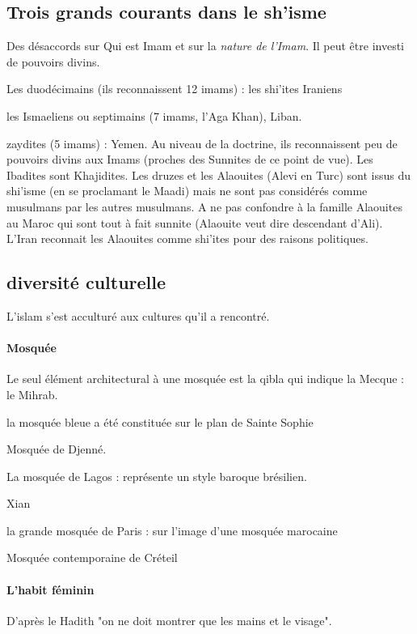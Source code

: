 \subsection{Trois grands courants dans le sh'isme}


\begin{Synthesis}
Des désaccords sur Qui est Imam et sur la \textit{nature de l'Imam}. Il peut être investi de pouvoirs divins.
\end{Synthesis}

\bi 
\item Les duodécimains (ils reconnaissent 12 imams) : les shi'ites Iraniens
\item les Ismaeliens ou septimains (7 imams, l'Aga Khan), Liban.
\item zaydites (5 imams) : Yemen. Au niveau de la doctrine, ils reconnaissent peu de pouvoirs divins aux Imams (proches des Sunnites de ce point de vue).
\ei 
Les Ibadites sont Khajidites. Les druzes et les Alaouites (Alevi en Turc) sont issus du shi'isme (en se proclamant le Maadi) mais ne sont pas considérés comme musulmans par les autres musulmans.  A ne pas confondre à la famille Alaouites au Maroc qui sont tout à fait sunnite (Alaouite veut dire descendant d'Ali). L'Iran reconnait les Alaouites comme shi'ites pour des raisons politiques. 

\subsection{diversité culturelle}
L'islam s'est acculturé aux cultures qu'il a rencontré.
\paragraph{Mosquée}
Le seul élément architectural à une mosquée est la qibla qui indique la Mecque : le Mihrab.

\bi
\item la mosquée bleue a été constituée sur le plan de Sainte Sophie
\item Mosquée de Djenné.
\item La mosquée de Lagos : représente un style baroque brésilien.
\item Xian
\item la grande mosquée de Paris : sur l'image d'une mosquée marocaine
\item Mosquée contemporaine de Créteil

\ei 

\paragraph{L'habit féminin} D'après le Hadith "on ne doit montrer que les mains et le visage". 

